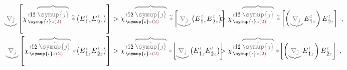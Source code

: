 \begin{subequations}
\begin{align}
	\mathcolor{gray}{\underbrace{\nabla_{\check{\jmath}}}} \left[ \chi^{\;\! \mathcolor{gray}{t} \hat{1} \hat{2} \;\! \mathcolor{gray}{\overbrace{\check{\symup{\jmath}}}}}_{\;\! \symup{\iota} \mathcolor{gray}{z} \textcolor{Maroon}{(2)}} ~\mathcolor{gray}{\widetilde *} \left( E^{\;\!\mathcolor{gray}{t}}_{\;\! \hat{1} \mathcolor{gray}{z}} E^{\;\!\mathcolor{gray}{t}}_{\;\! \hat{2} \mathcolor{gray}{z}} \right) \right] &> \chi^{\;\! \mathcolor{gray}{t} \hat{1} \hat{2} \;\! \mathcolor{gray}{\overbrace{\check{\symup{\jmath}}}}}_{\;\! \symup{\iota} \mathcolor{gray}{z} \textcolor{Maroon}{(2)}} ~\mathcolor{gray}{\widetilde *} \left[ \mathcolor{gray}{\underbrace{\nabla_{\check{\jmath}}}} \left( E^{\;\!\mathcolor{gray}{t}}_{\;\! \hat{1} \mathcolor{gray}{z}} E^{\;\!\mathcolor{gray}{t}}_{\;\! \hat{2} \mathcolor{gray}{z}} \right) \right] \hspace{-2em}&&> \chi^{\;\! \mathcolor{gray}{t} \hat{1} \hat{2} \;\! \mathcolor{gray}{\overbrace{\check{\symup{\jmath}}}}}_{\;\! \symup{\iota} \mathcolor{gray}{z} \textcolor{Maroon}{(2)}} ~\mathcolor{gray}{\widetilde *} \left[ \left( \mathcolor{gray}{\underbrace{\nabla_{\check{\jmath}}}} E^{\;\!\mathcolor{gray}{t}}_{\;\! \hat{1} \mathcolor{gray}{z}} \right) E^{\;\!\mathcolor{gray}{t}}_{\;\! \hat{2} \mathcolor{gray}{z}} \right]~, \label{eq:Volterra-time} \\
	\mathcolor{gray}{\underbrace{\nabla_{\check{\jmath}}}} \left[ \chi^{\;\! \mathcolor{gray}{t} \hat{1} \hat{2} \;\! \mathcolor{gray}{\overbrace{\check{\symup{\jmath}}}}}_{\;\! \symup{\iota} \mathcolor{gray}{z} \textcolor{Maroon}{(2)}} \mathcolor{gray}{*}\! \left( E^{\;\!\mathcolor{gray}{t}}_{\;\! \hat{1} \mathcolor{gray}{z}} E^{\;\!\mathcolor{gray}{t}}_{\;\! \hat{2} \mathcolor{gray}{z}} \right) \right] &> \chi^{\;\! \mathcolor{gray}{t} \hat{1} \hat{2} \;\! \mathcolor{gray}{\overbrace{\check{\symup{\jmath}}}}}_{\;\! \symup{\iota} \mathcolor{gray}{z} \textcolor{Maroon}{(2)}} \mathcolor{gray}{*}\! \left[ \mathcolor{gray}{\underbrace{\nabla_{\check{\jmath}}}} \left( E^{\;\!\mathcolor{gray}{t}}_{\;\! \hat{1} \mathcolor{gray}{z}} E^{\;\!\mathcolor{gray}{t}}_{\;\! \hat{2} \mathcolor{gray}{z}} \right) \right] \hspace{-2em}&&> \chi^{\;\! \mathcolor{gray}{t} \hat{1} \hat{2} \;\! \mathcolor{gray}{\overbrace{\check{\symup{\jmath}}}}}_{\;\! \symup{\iota} \mathcolor{gray}{z} \textcolor{Maroon}{(2)}} \mathcolor{gray}{*}\! \left[ \left( \mathcolor{gray}{\underbrace{\nabla_{\check{\jmath}}}} E^{\;\!\mathcolor{gray}{t}}_{\;\! \hat{1} \mathcolor{gray}{z}} \right) E^{\;\!\mathcolor{gray}{t}}_{\;\! \hat{2} \mathcolor{gray}{z}} \right]~, \label{eq:Volterra-space} \\

\end{align}
\end{subequations}
